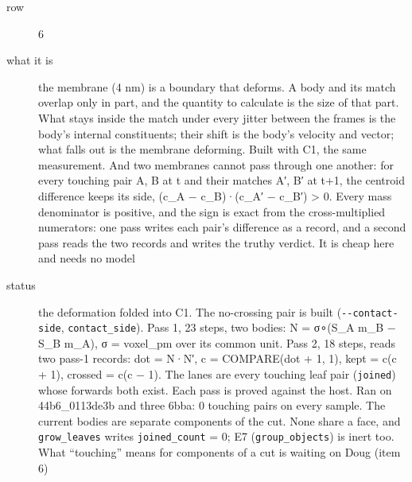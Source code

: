 \begin{description}
\item[{row}] 6
\item[{what it is}] the membrane (4 nm) is a boundary that deforms. A body and its match overlap only in part, and the quantity to calculate is the size of that part. What stays inside the match under every jitter between the frames is the body's internal constituents; their shift is the body's velocity and vector; what falls out is the membrane deforming. Built with C1, the same measurement. And two membranes cannot pass through one another: for every touching pair A, B at t and their matches A′, B′ at t+1, the centroid difference keeps its side, (c\_\allowbreak{}A − c\_\allowbreak{}B)·(c\_\allowbreak{}A′ − c\_\allowbreak{}B′) > 0. Every mass denominator is positive, and the sign is exact from the cross-multiplied numerators: one pass writes each pair's difference as a record, and a second pass reads the two records and writes the truthy verdict. It is cheap here and needs no model
\item[{status}] the deformation folded into C1. The no-crossing pair is built (\texttt{-\allowbreak{}-\allowbreak{}contact-\allowbreak{}side}, \texttt{contact\_\allowbreak{}side}). Pass 1, 23 steps, two bodies: N = σ∘(S\_\allowbreak{}A m\_\allowbreak{}B − S\_\allowbreak{}B m\_\allowbreak{}A), σ = voxel\_\allowbreak{}pm over its common unit. Pass 2, 18 steps, reads two pass-1 records: dot = N·N′, c = COMPARE(dot + 1, 1), kept = c(c + 1), crossed = c(c − 1). The lanes are every touching leaf pair (\texttt{joined}) whose forwards both exist. Each pass is proved against the host. Ran on 44b6\_\allowbreak{}0113de3b and three 6bba: 0 touching pairs on every sample. The current bodies are separate components of the cut. None share a face, and \texttt{grow\_\allowbreak{}leaves} writes \texttt{joined\_\allowbreak{}count} = 0; E7 (\texttt{group\_\allowbreak{}objects}) is inert too. What “touching” means for components of a cut is waiting on Doug (item 6)
\end{description}

